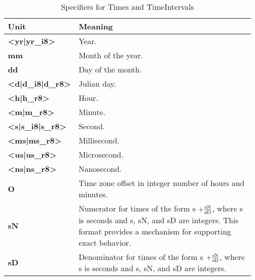 \newpage
\begin{center}
\begin{table}
\caption{\label{table:timeOpts}Specifiers for Times and TimeIntervals}
\begin{tabular}{|p{1in}|p{3.5in}|}
\hline
Unit & Meaning \\
\hline\hline
{\bf <yr|yr\_i8>} & Year. \\
\hline
{\bf mm} & Month of the year. \\
\hline
{\bf dd} & Day of the month. \\
\hline
{\bf <d|d\_i8|d\_r8>} & Julian day. \\
\hline
{\bf <h|h\_r8>} & Hour. \\
\hline
{\bf <m|m\_r8>} & Minute. \\
\hline
{\bf <s|s\_i8|s\_r8>} & Second. \\
\hline
{\bf <ms|ms\_r8>} & Millisecond. \\
\hline
{\bf <us|us\_r8>} & Microsecond. \\
\hline
{\bf <ns|ns\_r8>} & Nanosecond. \\
\hline
{\bf O} & Time zone offset in integer number of hours and minutes. \\
\hline
{\bf sN} & Numerator for times of the form s {\bf $ + 
\frac{{\rm sN}}{{\rm sD}}$}, where s is seconds and s, sN, and
sD are integers.  This format provides a mechanism for supporting
exact behavior. \\
\hline
{\bf sD} & Denominator for times of the form s {\bf $ + 
\frac{{\rm sN}}{{\rm sD}}$}, where s is seconds and s, sN, and
sD are integers. \\
\hline
\end{tabular}
\end{table}
\end{center}

